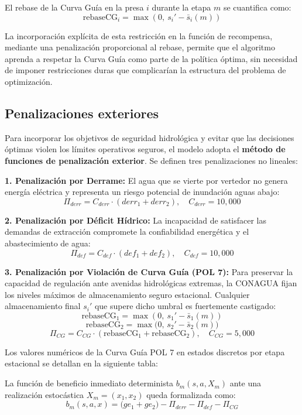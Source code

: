 \documentclass[
  spanish,
  letterpaper,
]{scrreprt}
\theoremstyle{definition}
\theoremstyle{remark}
\begin{document}
El rebase de la Curva Guía en la presa \(i\) durante la etapa \(m\) se
cuantifica como: \[
\text{rebaseCG}_i = \max(0,\ s_i' - \bar{s}_i(m))
\]

La incorporación explícita de esta restricción en la función de
recompensa, mediante una penalización proporcional al rebase, permite
que el algoritmo aprenda a respetar la Curva Guía como parte de la
política óptima, sin necesidad de imponer restricciones duras que
complicarían la estructura del problema de optimización.

\subsection{Penalizaciones exteriores}\label{sec-penalizaciones}

Para incorporar los objetivos de seguridad hidrológica y evitar que las
decisiones óptimas violen los límites operativos seguros, el modelo
adopta el \textbf{método de funciones de penalización exterior}. Se
definen tres penalizaciones no lineales:

\textbf{1. Penalización por Derrame:} El agua que se vierte por vertedor
no genera energía eléctrica y representa un riesgo potencial de
inundación aguas abajo:
\[\Pi_{derr} = C_{derr} \cdot (derr_1 + derr_2), \quad C_{derr} = 10,000\]

\textbf{2. Penalización por Déficit Hídrico:} La incapacidad de
satisfacer las demandas de extracción compromete la confiabilidad
energética y el abastecimiento de agua:
\[\Pi_{def} = C_{def} \cdot (def_1 + def_2), \quad C_{def} = 10,000\]

\textbf{3. Penalización por Violación de Curva Guía (POL 7):} Para
preservar la capacidad de regulación ante avenidas hidrológicas
extremas, la CONAGUA fijan los niveles máximos de almacenamiento seguro
estacional. Cualquier almacenamiento final \(s_{i}'\) que supere dicho
umbral es fuertemente castigado:
\[\text{rebaseCG}_1 = \max(0,\ s_{1}' - \bar{s}_1(m))\]
\[\text{rebaseCG}_2 = \max\big(0, \, s_{2}' - \bar{s}_2(m)\big)\]
\[\Pi_{CG} = C_{CG} \cdot (\text{rebaseCG}_1 + \text{rebaseCG}_2), \quad C_{CG} = 5,000\]

Los valores numéricos de la Curva Guía POL 7 en estados discretos por
etapa estacional se detallan en la siguiente tabla:

La función de beneficio inmediato determinista \(b_m(s, a, X_m)\) ante
una realización estocástica \(X_m = (x_1, x_2)\) queda formalizada como:
\[b_m(s, a, x) = \big(ge_1 + ge_2\big) - \Pi_{derr} - \Pi_{def} - \Pi_{CG}\]
\end{document}
